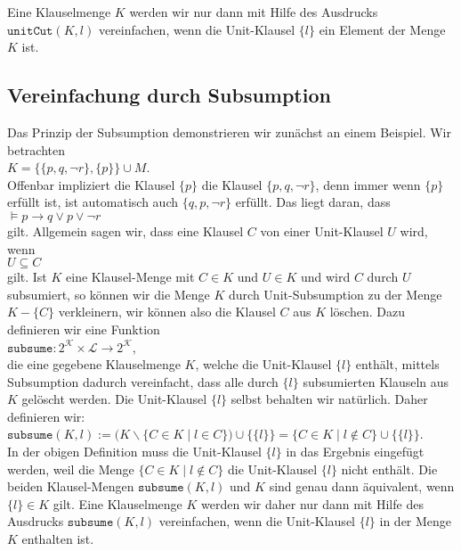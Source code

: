 Eine Klauselmenge $K$ werden wir nur dann mit Hilfe des Ausdrucks $\texttt{unitCut}(K, l)$ vereinfachen, wenn 
die Unit-Klausel $\{l\}$ ein Element der Menge $K$ ist.

\subsection{Vereinfachung durch Subsumption}
Das Prinzip der Subsumption demonstrieren wir zunächst an einem Beispiel.
Wir betrachten \\[0.2cm]
\hspace*{1.3cm} $K = \bigl\{ \{p, q, \neg r\}, \{p\} \bigr\} \cup M$. \\[0.2cm]
Offenbar impliziert die Klausel $\{p\}$ die Klausel $\{p, q, \neg r\}$, denn immer wenn
$\{p\}$ erfüllt ist, ist automatisch auch $\{q, p, \neg r\}$ erfüllt.  Das liegt daran, dass 
\\[0.2cm]
\hspace*{1.3cm} $\models p \rightarrow q \vee p \vee \neg r$
\\[0.2cm]
gilt.  Allgemein sagen wir, dass eine Klausel $C$
 von einer Unit-Klausel $U$  wird, wenn
\\[0.2cm]
\hspace*{1.3cm} $U \subseteq C$ \\[0.2cm]
gilt.  Ist $K$ eine Klausel-Menge mit $C \in K$ und $U \in K$ und wird
$C$ durch $U$ subsumiert, so können wir die Menge $K$ durch Unit-Subsumption zu der Menge $K - \{ C \}$
verkleinern, wir können also die Klausel $C$ aus $K$ löschen.  Dazu definieren wir eine Funktion
\\[0.2cm]
\hspace*{1.3cm}
$\texttt{subsume}: 2^\mathcal{K} \times \mathcal{L} \rightarrow 2^\mathcal{K}$,
\\[0.2cm]
die eine gegebene Klauselmenge $K$, welche die Unit-Klausel $\{l\}$ enthält, mittels Subsumption 
dadurch vereinfacht, dass alle durch $\{l\}$ subsumierten Klauseln aus $K$ gelöscht werden.
Die Unit-Klausel $\{l\}$ selbst behalten wir natürlich.  Daher definieren wir:
\\[0.2cm]
\hspace*{1.3cm}
$\texttt{subsume}(K, l) := 
\bigl(K \backslash \bigl\{ C \in K \mid l \in C \bigr\}\bigr) \cup \bigl\{\{l\}\bigr\} = 
\bigl\{ C \in K \mid l \not\in C \bigr\} \cup \bigl\{\{l\}\bigr\}$.
\\[0.2cm]
In der obigen Definition muss die Unit-Klausel $\{l\}$ in das Ergebnis eingefügt werden, weil die Menge
\mbox{$\bigl\{ C \in K \mid l \not\in C \bigr\}$} die Unit-Klausel $\{l\}$ nicht enthält.  Die beiden Klausel-Mengen
$\mathtt{subsume}(K,l)$ und $K$ sind genau dann äquivalent, wenn $\{l\} \in K$ gilt.  
Eine Klauselmenge $K$ werden wir daher nur dann mit Hilfe des Ausdrucks $\texttt{subsume}(K, l)$ vereinfachen, wenn 
die Unit-Klausel $\{l\}$ in der Menge $K$ ent\-halten ist.

